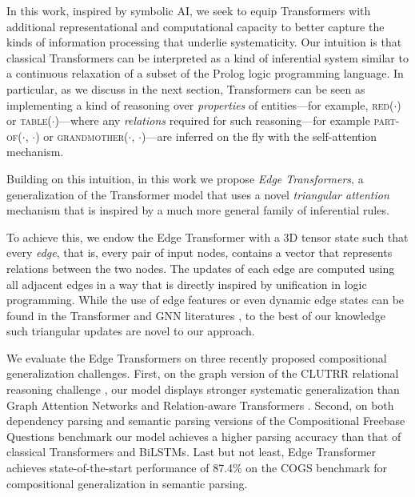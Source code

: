 \documentclass{article}
\newcommand{\fm}[1]{\textit{#1}}
\begin{document}
In this work, inspired by symbolic AI, we seek to equip Transformers
with additional representational and computational capacity to better
capture the kinds of information processing that underlie
systematicity. Our intuition is that classical Transformers can be
interpreted as a kind of inferential system similar to a continuous
relaxation of a subset of the Prolog logic programming language. In
particular, as we discuss in the next section, Transformers can be
seen as implementing a kind of reasoning over \fm{properties} of
entities---for example, \textsc{red}($\cdot$) or
\textsc{table}($\cdot$)---where any \textit{relations} required for
such reasoning---for example \textsc{part-of}($\cdot$, $\cdot$) or
\textsc{grandmother}($\cdot$, $\cdot$)---are inferred on the fly with
the self-attention mechanism.



Building on this intuition, in this work we propose
  \fm{Edge Transformers}, a generalization of the
  Transformer model that uses a novel \fm{triangular attention}
  mechanism that is inspired by a much more general family of
  inferential rules.
  
  To achieve this, we endow the Edge Transformer with a 3D tensor
  state such that every \textit{edge}, that is, every pair of input
  nodes, contains a vector that represents relations between the two
  nodes.  The updates of each edge are computed using all adjacent
  edges in a way that is directly inspired by unification in
  logic programming.  While the use of edge features or even dynamic
  edge states can be found in the Transformer and GNN literatures
  \citep{shaw_self-attention_2018,gilmer_neural_2017,gong_exploiting_2019},
  to the best of our knowledge such triangular updates are novel to
  our approach.

  We evaluate the Edge Transformers on three recently proposed
  compositional generalization challenges. First, on the graph version
  of the CLUTRR relational reasoning challenge
  \mbox{\citep{sinha_clutrr_2019}}, our model displays stronger
  systematic generalization than Graph Attention Networks
  \citep{velickovic_graph_2018} and Relation-aware Transformers
  \mbox{\citep{shaw_self-attention_2018}}. Second, on both dependency
  parsing and semantic parsing versions \citep{cfq_dependencies} of
  the Compositional Freebase Questions benchmark
  \citep{keysers_measuring_2020} our model achieves a higher parsing
  accuracy than that of classical Transformers and BiLSTMs. Last but
  not least, Edge Transformer achieves state-of-the-start performance
  of 87.4\% on the COGS benchmark for compositional generalization in
  semantic parsing.
\end{document}
